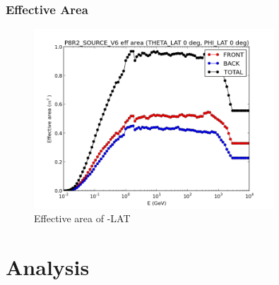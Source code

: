 \documentclass{beamer}
\begin{document}
\begin{frame}\frametitle{Effective Area}
\begin{figure}[h!]
    \centering
    \includegraphics[width=0.8\textwidth]{img/eff_energy_dist}
    \caption{Effective area of -LAT}
    \label{fig:lateff}
\end{figure}
\end{frame}





\section{Analysis}

\end{document}
